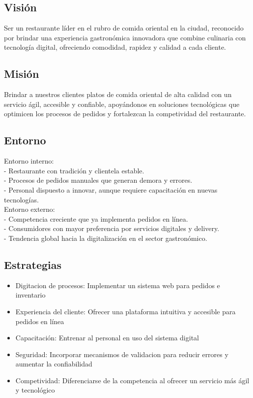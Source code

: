 \documentclass{article}
\begin{document}
\begin{doublespace}
    \subsection{Visión}
    \noindent Ser un restaurante líder en el rubro de comida oriental en la ciudad, reconocido por brindar una experiencia gastronómica innovadora que combine culinaria con tecnología digital, ofreciendo comodidad, rapidez y calidad a cada cliente.

    \subsection{Misión}
    \noindent Brindar a nuestros clientes platos de comida oriental de alta calidad con un servicio ágil, accesible y confiable, apoyándonos en soluciones tecnológicas que optimicen los procesos de pedidos y fortalezcan la competividad del restaurante.

    \subsection{Entorno}
    \noindent Entorno interno:\\
    - Restaurante con tradición y clientela estable. \\
    - Procesos de pedidos manuales que generan demora y errores. \\
    - Personal dispuesto a innovar, aunque requiere capacitación en nuevas tecnologías.\\
    Entorno externo:\\
    - Competencia creciente que ya implementa pedidos en línea.\\
    - Consumidores con mayor preferencia por servicios digitales y delivery.\\
    - Tendencia global hacia la digitalización en el sector gastronómico.\\

    \subsection{Estrategias}
    \begin{itemize}
        \item Digitacion de procesos: Implementar un sistema web para pedidos e inventario
        \item Experiencia del cliente: Ofrecer una plataforma intuitiva y accesible para pedidos en línea
        \item Capacitación: Entrenar al personal en uso del sistema digital
        \item Seguridad: Incorporar mecanismos de validacion para reducir errores y aumentar la confiabilidad
        \item Competividad: Diferenciarse de la competencia al ofrecer un servicio más ágil y tecnológico
    \end{itemize}


\end{doublespace}
\end{document}
